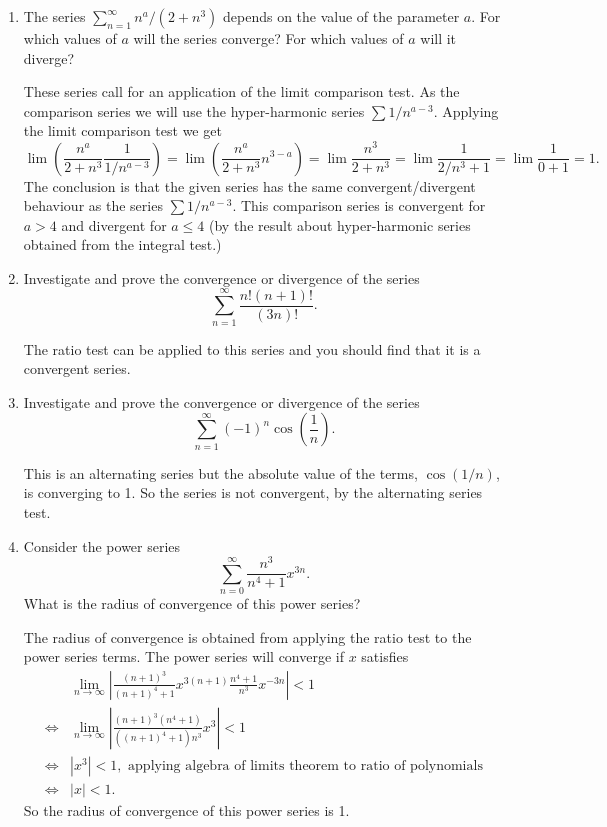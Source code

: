 \documentclass[oneside,10pt]{memoir}
\begin{document}
{\begin{enumerate}
\item
The series $\sum_{n=1}^\infty n^a / (2+n^3)$ depends on the value of the parameter $a$. For which values of $a$ will the series converge? For which values of $a$ will it diverge?

\begin{solution}
These series call for an application of the limit comparison test. As the comparison series we will use the hyper-harmonic series $\sum 1/n^{a-3}$. Applying the limit comparison test we get
$$\lim \left ( \frac{n^a}{2+n^3} \frac{1}{1/n^{a-3}} \right ) = \lim \left ( \frac{n^a}{2+n^3} n^{3-a} \right ) = \lim \frac{n^3}{2+n^3} = \lim \frac{1}{2/n^3 + 1} = \lim \frac{1}{0+1} = 1.$$
The conclusion is that the given series has the same convergent/divergent behaviour as the series $\sum 1/n^{a-3}$. This comparison series is convergent for $a > 4$ and divergent for $a \leq 4$ (by the result about hyper-harmonic series obtained from the integral test.)
\end{solution}



\item
Investigate and prove the convergence or divergence of the series
$$\sum_{n=1}^\infty \frac{n! (n+1)!}{(3n)!}.$$
\begin{solution}
The ratio test can be applied to this series and you should find that it is a convergent series.
\end{solution}

\item
Investigate and prove the convergence or divergence of the series
$$\sum_{n=1}^\infty (-1)^n \cos \left ( \frac{1}{n} \right ).$$
\begin{solution}
This is an alternating series but the absolute value of the terms, $\cos(1/n)$, is converging to 1. So the series is not convergent, by the alternating series test.
\end{solution}

\item
Consider the power series
$$\sum_{n=0}^\infty \frac{n^3}{n^4 +1} x^{3n}.$$
What is the radius of convergence of this power series?
\begin{solution}
The radius of convergence is obtained from applying the ratio test to the power series terms. The power series will converge if $x$ satisfies
\begin{align*}
&\lim_{n \to \infty} \left | \frac{(n+1)^3}{(n+1)^4 +1} x^{3(n+1)} \frac{n^4+1}{n^3} x^{-3n} \right |
 < 1\\
 \Leftrightarrow &\lim_{n \to \infty} \left | \frac{(n+1)^3(n^4+1)}{((n+1)^4 +1)n^3} x^{3} \right |
 < 1\\
 \Leftrightarrow & |x^3|<1, \text{ applying algebra of limits theorem to ratio of polynomials} \\
 \Leftrightarrow & |x| < 1.
\end{align*}
So the radius of convergence of this power series is 1.
\end{solution}


\end{enumerate}}
\end{document}
